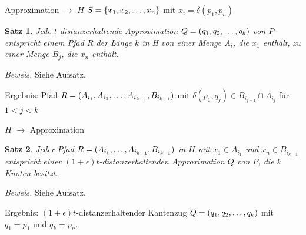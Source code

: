 \documentclass{beamer}
\newtheorem{thm}{Satz}
\begin{document}
	\begin{frame}{Approximation $\rightarrow$ $H$}
		$S = \{x_1, x_2, \mathellipsis, x_n\}$ mit $x_i = \delta(p_1, p_n)$
		\begin{thm}
			Jede $t$-distanzerhaltende Approximation $Q = (q_1, q_2, \mathellipsis, q_k)$ von $P$ entspricht einem Pfad $R$ der Länge $k$ in H von einer Menge $A_i$, die $x_1$ enthält, zu einer Menge $B_j$, die $x_n$ enthält.
		\end{thm}
		\textit{Beweis.} Siehe Aufsatz.
		
		\vspace{5px}
		Ergebnis: Pfad $R = (A_{i_1}, A_{i_2}, \mathellipsis, A_{i_{k-1}}, B_{i_{k-1}})$ mit $\delta(p_1, q_j) \in B_{i_{j-1}} \cap A_{i_j}$ für $1 < j < k$
		
%		
%			
	\end{frame}
	
%		
%	
	
	\begin{frame}{$H$ $\rightarrow$ Approximation}
		\begin{thm}
			Jeder Pfad $R = (A_{i_1}, \mathellipsis, A_{i_{k-1}}, B_{i_{k-1}})$ in $H$ mit $x_1 \in A_{i_1}$ und $x_n \in B_{i_{k-1}}$ entspricht einer $(1+\epsilon)t$-distanzerhaltenden Approximation $Q$ von $P$, die $k$ Knoten besitzt.
		\end{thm}
		\textit{Beweis.} Siehe Aufsatz.
		
		\vspace{5px}
		Ergebnis: $(1 + \epsilon)t$-distanzerhaltender Kantenzug $Q = (q_1, q_2, \mathellipsis, q_k)$ mit $q_1 = p_1$ und $q_k = p_n$.
	\end{frame}
	
\end{document}
